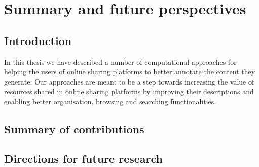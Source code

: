 
\chapter{Summary and future perspectives}
\label{sec:conclusion}

\section{Introduction}

In this thesis we have described a number of computational approaches for helping the users of online sharing platforms to better annotate the content they generate.
Our approaches are meant to be a step towards increasing the value of resources shared in online sharing platforms by improving their descriptions and enabling better organisation, browsing and searching functionalities. %


\section{Summary of contributions}
\label{sec:conclusion:summary}


\section{Directions for future research}
\label{sec:conclusion:future}

